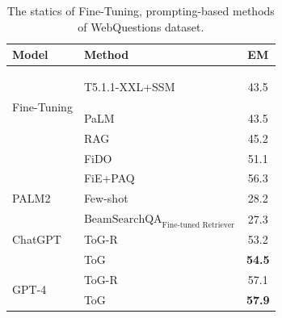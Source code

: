 \documentclass{article} %
\begin{document}
\begin{table}[]
\centering
\begin{tabular}{llc}
\hline
       \textbf{Model}    & \textbf{Method} &  \textbf{EM} \\ \hline
\multirow{3}{*}{Fine-Tuning}     
 &  T5.1.1-XXL+SSM 

 \citep{raffel2020exploring}                    &  43.5 \\
&  PaLM \citep{palm}                    & 43.5 \\
&  RAG \citep{lewis2021retrievalaugmented}                    & 45.2 \\
&  FiDO  \citep{de2022fido}                       & 51.1 \\
&  FiE+PAQ	 \citep{webq1}       & 56.3 \\ 
                                 
                                 
                                 
                                	    \hline
PALM2                 &  Few-shot \citep{DB-BLINDER}            &  28.2  \\ \hline
\multirow{3}{*}{ChatGPT} 
&  $\text{BeamSearchQA}_{\text{Fine-tuned Retriever}}$ \citep{beamsearchqa}            &  27.3  \\
                                 &  ToG-R                   &  53.2  \\
                                 &  ToG                   & \textbf{54.5}   \\ \hline
\multirow{3}{*}{GPT-4} 
                                 &  ToG-R                   &  57.1  \\
                                 &  ToG                   & \textbf{57.9}   \\ \hline
\end{tabular}

\caption{The statics of Fine-Tuning, prompting-based methods of WebQuestions dataset.}
\label{tab: webq}
\end{table}
\end{document}
